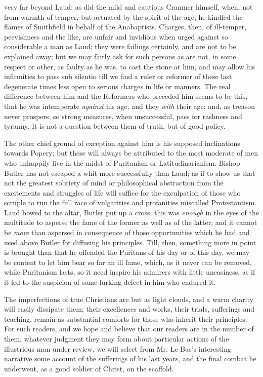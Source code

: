 very far beyond Laud; as did the mild and cautious Cranmer himself,
when, not from warmth of temper, but actuated by the spirit of the age,
he kindled the flames of Smithfield in behalf of the Anabaptists.
Charges, then, of ill-temper, peevishness and the like, are unfair and
invidious when urged against so considerable a man as Laud; they were
failings certainly, and are not to be explained away; but we may fairly
ask for such persons as are not, in some respect or other, as faulty as
he was, to cast the stone at him, and may allow his infirmities to pass
sub silentio till we find a ruler or reformer of these last degenerate
times less open to serious charges in life or manners. The real
difference between him and the Reformers who preceded him seems to be
this, that he was intemperate \emph{against} his age, and they \emph{with}
their age; and, as treason never prospers, so strong measures, when
unsuccessful, pass for rashness and tyranny. It is not a question
between them of truth, but of good policy.

The other chief ground of exception against him is
his supposed inclinations towards Popery; but these will always be
attributed to the most moderate of men who unhappily live in the midst of Puritanism or Latitudinarianism. Bishop Butler has not escaped
a whit more successfully than Laud; as if to show us that not the
greatest sobriety of mind or philosophical abstraction from the
excitements and struggles of life will suffice for the exculpation of
those who scruple to run the full race of vulgarities and profanities
miscalled Protestantism. Laud bowed to the altar, Butler put up a cross;
this was \emph{enough} in the eyes of the multitude to asperse the fame
of the former as well as of the latter; and it cannot be \emph{more}
than aspersed in consequence of those opportunities which he had and
used above Butler for diffusing his principles. Till, then, something
more in point is brought than that he offended the Puritans of his day
or of this day, we may be content to let him bear so far an ill fame,
which, as it never can be removed, while Puritanism lasts, so it need
inspire his admirers with little uneasiness, as if it led to the
suspicion of some lurking defect in him who endured it.

The imperfections of true Christians are but as
light clouds, and a warm charity will easily dissipate them; their
excellences and works, their trials, sufferings and teaching, remain as
substantial comforts for those who inherit their principles. For such
readers, and we hope and believe that our readers are in the number of
them, whatever judgment they may form about particular actions of the
illustrious man under review, we will select from Mr. Le Bas's
interesting narrative some account of the sufferings of his last years,
and the final combat he underwent, as a good soldier of Christ, on the
scaffold.

